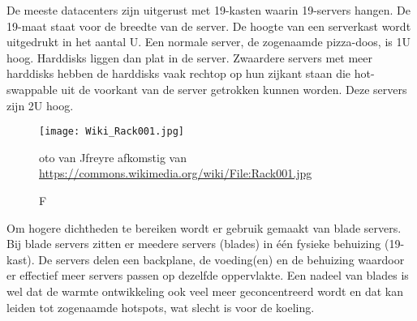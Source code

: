 De meeste datacenters zijn uitgerust met 19\inch-kasten waarin 19\inch-servers hangen. De 19\inch-maat staat voor de breedte van de server. De hoogte van een serverkast wordt uitgedrukt in het aantal U. Een normale server, de zogenaamde pizza-doos, is 1U hoog. Harddisks liggen dan plat in de server. Zwaardere servers met meer harddisks hebben de harddisks vaak rechtop op hun zijkant staan die hot-swappable uit de voorkant van de server getrokken kunnen worden. Deze servers zijn 2U hoog.

\begin{figure}[H]
\texttt{[image: Wiki\_Rack001.jpg]}
\caption Foto van Jfreyre afkomstig van \url{https://commons.wikimedia.org/wiki/File:Rack001.jpg}
\centering
\end{figure}

Om hogere dichtheden te bereiken wordt er gebruik gemaakt van blade servers. Bij blade servers zitten er meedere servers (blades) in \'e\'en fysieke behuizing (19\inch-kast). De servers delen een backplane, de voeding(en) en de behuizing waardoor er effectief meer servers passen op dezelfde oppervlakte. Een nadeel van blades is wel dat de warmte ontwikkeling ook veel meer geconcentreerd wordt en dat kan leiden tot zogenaamde hotspots, wat slecht is voor de koeling.
